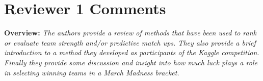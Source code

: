 \documentclass[11pt]{article} %
\begin{document}
%
%
\section*{Reviewer 1 Comments}
{\bf Overview:} \emph{The authors provide a review of methods that have been used to rank or evaluate team strength and/or predictive match ups. They also provide a brief introduction to a method they developed as participants of the Kaggle competition. Finally they provide some discussion and insight into how much luck plays a role in selecting winning teams in a March Madness bracket.}\\
\\
\end{document}
